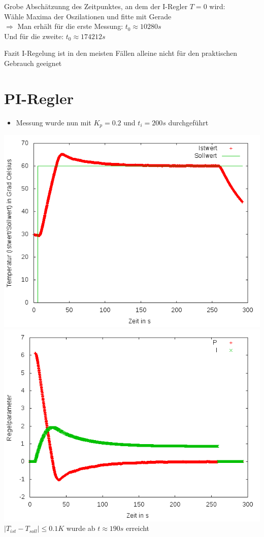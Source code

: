 \documentclass[compress,11pt]{beamer}
\begin{document}
\begin{frame}
Grobe Abschätzunng des Zeitpunktes, an dem der I-Regler $T = 0$ wird:\\
Wähle Maxima der Oszilationen und fitte mit Gerade\\
$\Rightarrow$ Man erhält für die erste Messung:  $t_0 \approx 10280 s$\\
Und für die zweite:  $t_0 \approx 174212 s$
\begin{block}{Fazit}
I-Regelung ist in den meisten Fällen alleine nicht für den praktischen Gebrauch geeignet
\end{block}
\end{frame}
\section{PI-Regler}
\begin{frame}
\begin{itemize}
\item Messung wurde nun mit $K_p = 0.2$ und $t_i =200s$ durchgeführt
\end{itemize}
\includegraphics[width=.5\textwidth]{../2aufgabe/2dk,2}
\includegraphics[width=.5\textwidth]{../2aufgabe/2dk,2_parameter}\\
$|T_{ist} - T_{soll}| \leq 0.1 K$ wurde ab $t \approx 190 s$ erreicht 
\end{frame}
\end{document}
